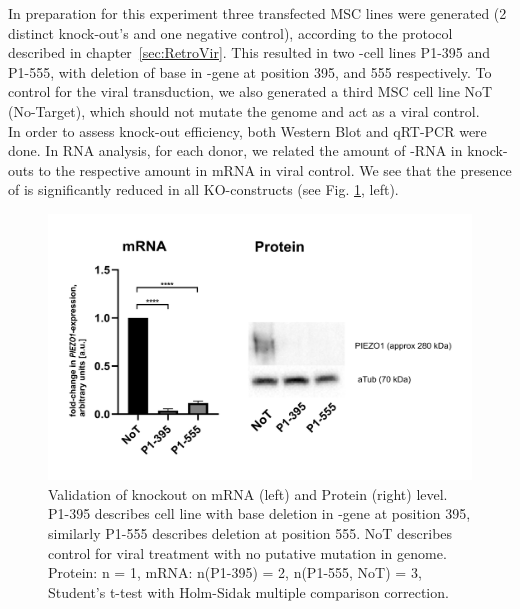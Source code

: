 In preparation for this experiment three transfected MSC lines were generated (2 distinct \Piezo{} knock-out's and one negative control), according to the protocol described in chapter~\vref{sec:RetroVir}. This resulted in two \Piezo{}-cell lines P1-395 and P1-555, with deletion of base in \PiezoGene{}-gene at position 395, and 555 respectively. To control for the viral transduction, we also generated a third MSC cell line NoT (No-Target), which should not mutate the genome and act as a viral control.\\ 
In order to assess knock-out efficiency, both Western Blot and qRT-PCR were done.
In RNA analysis, for each donor, we related the amount of \PiezoGene{}-RNA in knock-outs to the respective amount in mRNA in viral control. We see that the presence of \PiezoGene{} is significantly reduced in all KO-constructs (see Fig. \ref{fig:KO-Verification}, left). 

\begin{figure}
	\centering
	\includegraphics[width=\linewidth]{Piezo1KO_Verification_WBandPCR.png}
	\caption{Validation of knockout on mRNA (left) and Protein (right) level. P1-395 describes cell line with base deletion in \PiezoGene{}-gene at position 395, similarly P1-555 describes deletion at position 555. NoT describes control for viral treatment with no putative mutation in genome. Protein: n = 1, mRNA:  n(P1-395) = 2, n(P1-555, NoT) = 3, Student's t-test with Holm-Sidak multiple comparison correction.}
	\label{fig:KO-Verification}
\end{figure}


